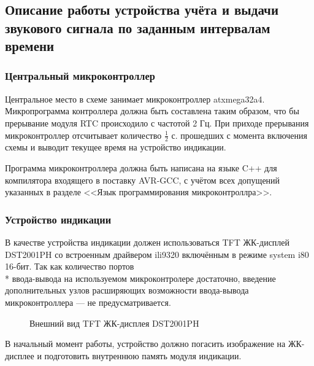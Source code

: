 \subsection{Описание работы устройства учёта и выдачи звукового сигнала по заданным интервалам времени}
\subsubsection{Центральный микроконтроллер}
\begin{par}
Центральное место в схеме занимает микроконтроллер atxmega32a4. Микропрограмма контроллера
должна быть составлена таким образом, что бы прерывание модуля RTC происходило с частотой 2 Гц.
При приходе прерывания микроконтроллер отсчитывает количество $ \frac{1}{2} $ с. прошедших с момента
включения схемы и выводит текущее время на устройство индикации.
\end{par}

\begin{par}
Программа микроконтроллера должна быть написана на языке C++ для компилятора входящего в поставку
AVR-GCC, с учётом всех допущений указанных в разделе <<Язык программирования микроконтроллра>>.
\end{par}

\subsubsection{Устройство индикации}
\begin{par}
В качестве устройства индикации должен использоваться TFT ЖК-дисплей DST2001PH\cite{display} со встроенным
драйвером ili9320 включённым в режиме system i80 16-бит\cite{ili9320}.
Так как количество портов\\*
ввода-вывода на используемом микроконтролере достаточно, введение дополнительных узлов
расширяющих возможности 
ввода-вывода микроконтроллера --- не предусматривается.
\begin{figure}[h]
	\caption{Внешний вид TFT ЖК-дисплея DST2001PH}
	\label{img:iili9320}
\end{figure}
\end{par}



\begin{par}
В начальный момент работы, устройство должно погасить изображение на ЖК-дисплее и подготовить внутреннюю
память модуля индикации.
\end{par}


